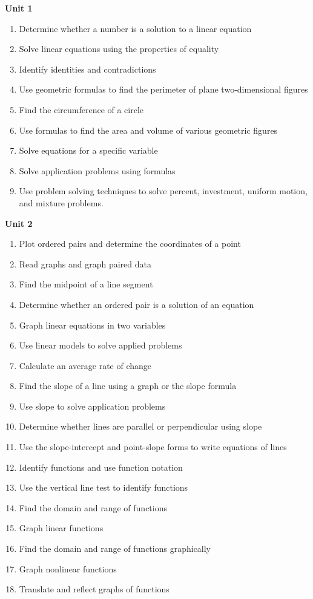\documentclass[10pt]{article}
\newenvironment{alphalist}{
\begin{enumerate}[label=(\arabic*),widest=107 ,leftmargin=25pt, itemsep=0pt]}
{\end{enumerate}}
\begin{document}
\noindent \textbf{Unit 1}
\begin{alphalist}
    \item Determine whether a number is a solution to a linear equation
    \item Solve linear equations using the properties of equality
    \item Identify identities and contradictions
    \item Use geometric formulas to find the perimeter of plane two-dimensional figures
    \item Find the circumference of a circle
    \item Use formulas to find the area and volume of various geometric figures
    \item Solve equations for a specific variable
    \item Solve application problems using formulas
    \item Use problem solving techniques to solve percent, investment, uniform motion, and mixture problems.
\end{alphalist}
\noindent \textbf{Unit 2}
\begin{alphalist}
    \item Plot ordered pairs and determine the coordinates of a point
    \item Read graphs and graph paired data
    \item Find the midpoint of a line segment
    \item Determine whether an ordered pair is a solution of an equation
    \item Graph linear equations in two variables
    \item Use linear models to solve applied problems
    \item Calculate an average rate of change
    \item Find the slope of a line using a graph or the slope formula
    \item Use slope to solve application problems
    \item Determine whether lines are parallel or perpendicular using slope
    \item Use the slope-intercept and point-slope forms to write equations of lines
    \item Identify functions and use function notation
    \item Use the vertical line test to identify functions
    \item Find the domain and range of functions
    \item Graph linear functions
    \item Find the domain and range of functions graphically
    \item Graph nonlinear functions
    \item Translate and reflect graphs of functions
\end{alphalist}
 
\end{document}
